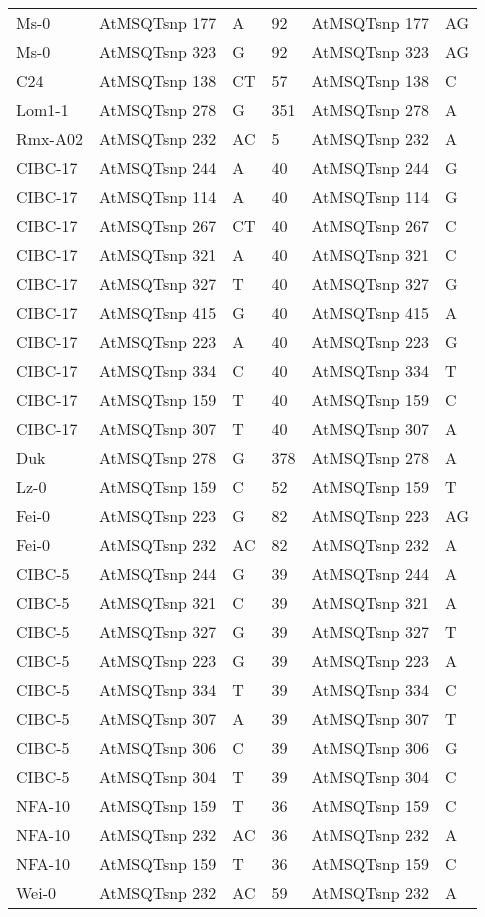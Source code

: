 \begin{center}
\begin{longtable}{|l|l|l|l|l|l|}
Ms-0&AtMSQTsnp 177&A&92&AtMSQTsnp 177&AG\\
Ms-0&AtMSQTsnp 323&G&92&AtMSQTsnp 323&AG\\
C24&AtMSQTsnp 138&CT&57&AtMSQTsnp 138&C\\
Lom1-1&AtMSQTsnp 278&G&351&AtMSQTsnp 278&A\\
Rmx-A02&AtMSQTsnp 232&AC&5&AtMSQTsnp 232&A\\
CIBC-17&AtMSQTsnp 244&A&40&AtMSQTsnp 244&G\\
CIBC-17&AtMSQTsnp 114&A&40&AtMSQTsnp 114&G\\
CIBC-17&AtMSQTsnp 267&CT&40&AtMSQTsnp 267&C\\
CIBC-17&AtMSQTsnp 321&A&40&AtMSQTsnp 321&C\\
CIBC-17&AtMSQTsnp 327&T&40&AtMSQTsnp 327&G\\
CIBC-17&AtMSQTsnp 415&G&40&AtMSQTsnp 415&A\\
CIBC-17&AtMSQTsnp 223&A&40&AtMSQTsnp 223&G\\
CIBC-17&AtMSQTsnp 334&C&40&AtMSQTsnp 334&T\\
CIBC-17&AtMSQTsnp 159&T&40&AtMSQTsnp 159&C\\
CIBC-17&AtMSQTsnp 307&T&40&AtMSQTsnp 307&A\\
Duk&AtMSQTsnp 278&G&378&AtMSQTsnp 278&A\\
Lz-0&AtMSQTsnp 159&C&52&AtMSQTsnp 159&T\\
Fei-0&AtMSQTsnp 223&G&82&AtMSQTsnp 223&AG\\
Fei-0&AtMSQTsnp 232&AC&82&AtMSQTsnp 232&A\\
CIBC-5&AtMSQTsnp 244&G&39&AtMSQTsnp 244&A\\
CIBC-5&AtMSQTsnp 321&C&39&AtMSQTsnp 321&A\\
CIBC-5&AtMSQTsnp 327&G&39&AtMSQTsnp 327&T\\
CIBC-5&AtMSQTsnp 223&G&39&AtMSQTsnp 223&A\\
CIBC-5&AtMSQTsnp 334&T&39&AtMSQTsnp 334&C\\
CIBC-5&AtMSQTsnp 307&A&39&AtMSQTsnp 307&T\\
CIBC-5&AtMSQTsnp 306&C&39&AtMSQTsnp 306&G\\
CIBC-5&AtMSQTsnp 304&T&39&AtMSQTsnp 304&C\\
NFA-10&AtMSQTsnp 159&T&36&AtMSQTsnp 159&C\\
NFA-10&AtMSQTsnp 232&AC&36&AtMSQTsnp 232&A\\
NFA-10&AtMSQTsnp 159&T&36&AtMSQTsnp 159&C\\
Wei-0&AtMSQTsnp 232&AC&59&AtMSQTsnp 232&A\\

\end{longtable}
\end{center}

